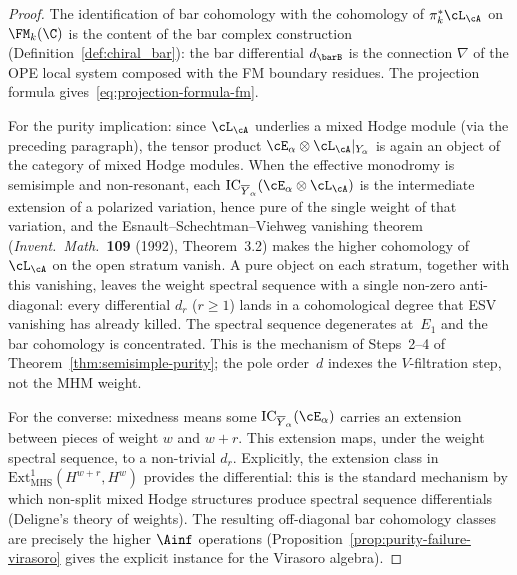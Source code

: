 \begin{proof}
The identification of bar cohomology with the cohomology of
$\pi_k^*\cL_\cA$ on $\FM_k(\C)$ is the content of the bar
complex construction
(Definition~\ref{def:chiral_bar}): the bar differential
$d_{\barB}$ is the connection $\nabla$ of the OPE local system
composed with the FM boundary residues. The projection formula
gives~\eqref{eq:projection-formula-fm}.

For the purity implication: since $\cL_\cA$ underlies a mixed
Hodge module (via the preceding paragraph), the tensor product
$\cE_\alpha \otimes \cL_\cA|_{Y_\alpha}$ is again an object of
the category of mixed Hodge modules. When the effective monodromy
is semisimple and non-resonant, each
$\IC_{\overline{Y}_\alpha}(\cE_\alpha \otimes \cL_\cA)$ is the
intermediate extension of a polarized variation, hence pure of the
single weight of that variation, and the Esnault--Schechtman--Viehweg
vanishing theorem (\emph{Invent.\ Math.}\ \textbf{109} (1992),
Theorem~3.2) makes the higher cohomology of $\cL_\cA$ on the open
stratum vanish. A pure object on each stratum, together with this
vanishing, leaves the weight spectral sequence with a single
non-zero anti-diagonal: every differential $d_r$ ($r \geq 1$) lands
in a cohomological degree that ESV vanishing has already killed.
The spectral sequence degenerates at~$E_1$ and the bar cohomology is
concentrated. This is the mechanism of Steps~2--4 of
Theorem~\ref{thm:semisimple-purity}; the pole order~$d$ indexes the
$V$-filtration step, not the MHM weight.

For the converse: mixedness means some
$\IC_{\overline{Y}_\alpha}(\cE_\alpha)$ carries an extension
between pieces of weight $w$ and $w + r$. This extension maps,
under the weight spectral sequence, to a non-trivial $d_r$.
Explicitly, the extension class in
$\mathrm{Ext}^1_{\mathrm{MHS}}(H^{w+r}, H^w)$ provides the
differential: this is the standard mechanism by which
non-split mixed Hodge structures produce spectral sequence
differentials (Deligne's theory of weights). The resulting
off-diagonal bar cohomology classes are precisely the higher
$\Ainf$ operations (Proposition~\ref{prop:purity-failure-virasoro}
gives the explicit instance for the Virasoro algebra).
\end{proof}

